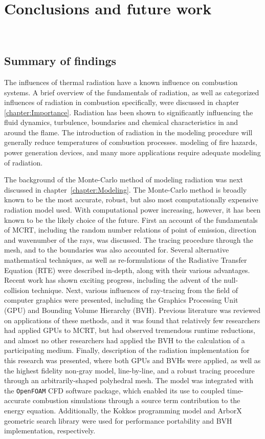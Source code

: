 \addchapheadtotoc
\chapter{Conclusions and future work}~\label{chapter:conclusion}

\section{Summary of findings}
The influences of thermal radiation have a known influence on combustion systems. A brief overview of the fundamentals of radiation, as well as categorized influences of radiation in combustion specifically, were discussed in chapter \ref{chapter:Importance}. 
Radiation has been shown to significantly influencing the fluid dynamics, turbulence, boundaries and chemical characteristics in and around the flame.
The introduction of radiation in the modeling procedure will generally reduce temperatures of combustion processes. 
modeling of fire hazards, power generation devices, and many more applications require adequate modeling of radiation. 

The background of the Monte-Carlo method of modeling radiation was next discussed in chapter~\ref{chapter:Modeling}. The Monte-Carlo method is broadly known to be the most accurate, robust, but also most computationally expensive radiation model used.
With computational power increasing, however, it has been known to be the likely choice of the future. First an account of the fundamentals of MCRT, including the random number relations of point of emission, direction and wavenumber of the rays, was discussed.
The tracing procedure through the mesh, and to the boundaries was also accounted for.
Several alternative mathematical techniques, as well as re-formulations of the Radiative Transfer Equation (RTE) were described in-depth, along with their various advantages. Recent work has shown exciting progress, including the advent of the null-collision technique. Next, various influences of ray-tracing from the field of computer graphics were presented, including the Graphics Processing Unit (GPU) and Bounding Volume Hierarchy (BVH).
Previous literature was reviewed on applications of these methods, and it was found that relatively few researchers had applied GPUs to MCRT, but had observed tremendous runtime reductions, and almost no other researchers had applied the BVH to the calculation of a participating medium.
Finally, description of the radiation implementation for this research was presented, where both GPUs and BVHs were applied, as well as the highest fidelity non-gray model, line-by-line, and a robust tracing procedure through an arbitrarily-shaped polyhedral mesh.
The model was integrated with the \verb|OpenFOAM| CFD software package, which enabled its use to coupled time-accurate combustion simulations through a source term contribution to the energy equation. Additionally, the Kokkos programming model and ArborX geometric search library were used for performance portability and BVH implementation, respectively.

